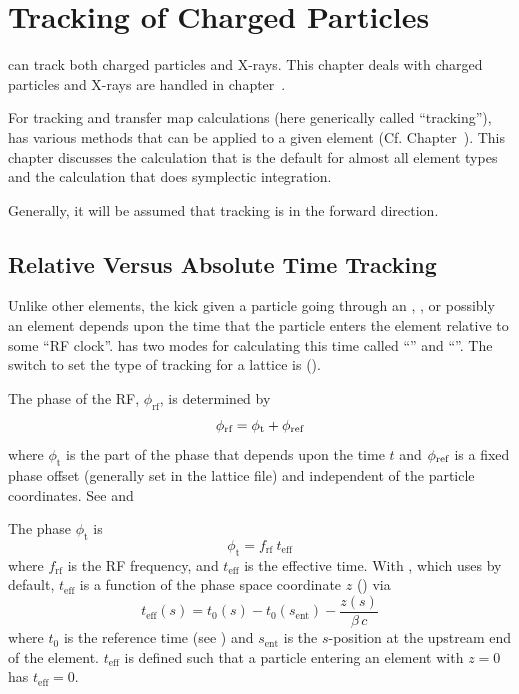 \chapter{Tracking of Charged Particles}
\label{c:charged.track}

\bmad can track both charged particles and X-rays. This chapter deals with charged particles and
X-rays are handled in chapter~.

For tracking and transfer map calculations (here generically called ``tracking''), \bmad has various
methods that can be applied to a given element (Cf. Chapter~). This chapter
discusses the  calculation that is the default for almost all element types and
the  calculation that does symplectic integration.

Generally, it will be assumed that tracking is in the forward direction.

\section{Relative Versus Absolute Time Tracking}
\label{s:rf.time}

Unlike other elements, the kick given a particle going through an , , or
possibly an  element depends upon the time that the particle enters the element
relative to some ``RF clock''. \bmad has two modes for calculating this time called ``'' and ``''. The switch to set the type of tracking for a
lattice is  ().

The phase of the RF, $\phi_\text{rf}$, is determined by
\begin{equation}
  \phi_\text{rf} = \phi_\text{t} + \phi_{\text{ref}}
\end{equation}
where $\phi_\text{t}$ is the part of the phase that depends upon the time $t$ and $\phi_{\text{ref}}$
is a fixed phase offset (generally set in the lattice file) and independent of the particle
coordinates. See  and 

The phase $\phi_\text{t}$ is 
\begin{equation}
  \phi_\text{t} = f_\text{rf} \ t_\text{eff}
\end{equation}
where $f_\text{rf}$ is the RF frequency, and $t_\text{eff}$ is the effective time. With , which \bmad uses by default, $t_\text{eff}$ is a function of the 
phase space coordinate $z$ () via
\begin{equation}
  t_\text{eff}(s) = t_0(s) - t_0(s_\text{ent}) - \frac{z(s)}{\beta \, c}
  \label{tttz}
\end{equation}
where $t_0$ is the reference time (see ) and $s_\text{ent}$ is the $s$-position at the
upstream end of the element. $t_\text{eff}$ is defined such that a particle entering an element 
with $z = 0$ has $t_\text{eff} = 0$.

